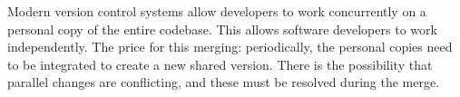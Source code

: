 \documentclass[10pt,openany,twoside,letterpaper,extrafontsizes]{memoir}
\begin{document}
\begin{Spacing}{\commonToolsSpacing}


Modern version control systems allow developers to work concurrently
on a personal copy of the entire codebase. This allows
software developers to work
independently. The price for this merging: periodically, the personal copies
need to be integrated to create a new shared version.
There is the possibility that parallel changes are conflicting,
and these must be resolved during the merge.



\end{Spacing}
\end{document}
